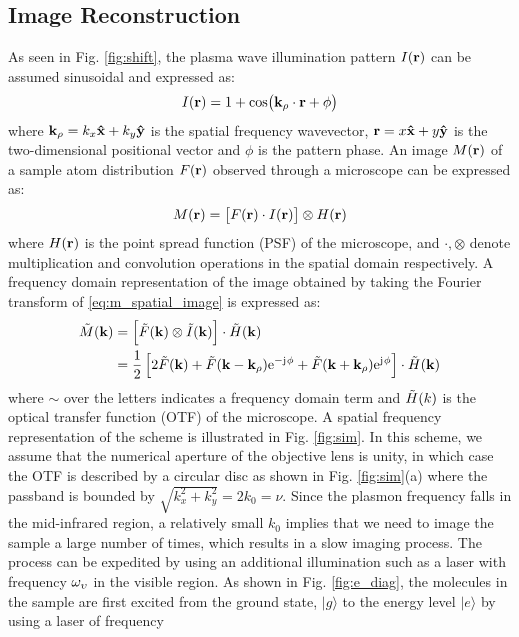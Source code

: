 \subsection{Image Reconstruction}
%
As seen in Fig. \ref{fig:shift}, the plasma wave illumination pattern $I(\mathbf{r})$ can be assumed sinusoidal and expressed as:
%
\begin{equation}
  I(\mathbf{r}) = 1 + \cos(\mathbf{k}_{\rho} \cdot \mathbf{r} + \phi)
  \label{eq:intensity}
\end{equation}
%
where $\mathbf{k}_{\rho} = k_x \mathbf{\hat{x}} + k_y \mathbf{\hat{y}}$ is the spatial frequency wavevector,  $\mathbf{r} = x \mathbf{\hat{x}} +  y \mathbf{\hat{y}}$ is the two-dimensional positional vector and $\phi$ is the pattern phase. An image $M(\mathbf{r})$ of a sample atom distribution $F(\mathbf{r})$ observed through a microscope can be expressed as:
%
\begin{equation}
  M(\mathbf{r}) = \left[ F(\mathbf{r}) \cdot I(\mathbf{r}) \right] \otimes H(\mathbf{r})
  \label{eq:m_spatial_image}
\end{equation}
%
where $H(\mathbf{r})$ is the point spread function (PSF) of the microscope, and $\cdot, \otimes$ denote multiplication and convolution operations in the spatial domain respectively. A frequency domain representation of the image obtained by taking the Fourier transform of \eqref{eq:m_spatial_image} is expressed as:
%
\begin{equation}
  \begin{split}
    \tilde{M}(\mathbf{k}) &= \left[ \tilde{F}(\mathbf{k}) \otimes \tilde{I}(\mathbf{k}) \right] \cdot \tilde{H}(\mathbf{k}) \\
     &= \frac{1}{2} \left[ 2\tilde{F}(\mathbf{k}) + \tilde{F}(\mathbf{k} - \mathbf{k}_{\rho}) \mathrm{e}^{- \mathrm{j}\mkern1mu \phi} + \tilde{F}(\mathbf{k} + \mathbf{k}_{\rho}) \mathrm{e}^{\mathrm{j}\mkern1mu \phi} \right] \cdot \tilde{H}(\mathbf{k})
  \end{split}
  \label{eq:m_ft}
\end{equation}
%
where $\sim$ over the letters indicates a frequency domain term and $\tilde{H}(k)$ is the optical transfer function (OTF) of the microscope. A spatial frequency representation of the scheme is illustrated in Fig. \ref{fig:sim}. In this scheme, we assume that the numerical aperture of the objective lens is unity, in which case the OTF is described by a circular disc as shown in Fig. \ref{fig:sim}(a) where the passband is bounded by $\sqrt{k_x^2 + k_y^2} = 2 k_{0} = \nu$. Since the plasmon frequency falls in the mid-infrared region, a relatively small $k_0$ implies that we need to image the sample a large number of times, which results in a slow imaging process. The process can be expedited by using an additional illumination such as a laser with frequency $\omega_{\upsilon}$ in the visible region. As shown in Fig. \ref{fig:e_diag}, the molecules in the sample are first excited from the ground state, $|g\rangle$ to the energy level $|e\rangle$ by using a laser of frequency
